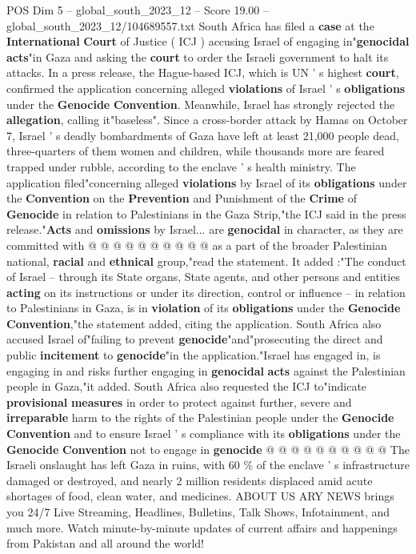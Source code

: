 \begin{textsample}{POS Dim 5 – global\_south\_2023\_12 – Score 19.00 – global\_south\_2023\_12/104689557.txt}  \label{ex:f5_pos_104}
South Africa has filed a \textbf{case} at the \textbf{International} \textbf{Court} of Justice ( ICJ ) accusing Israel of engaging in"\textbf{genocidal} \textbf{acts}"in Gaza and asking the \textbf{court} to order the Israeli government to halt its attacks.
In a press release, the Hague-based ICJ, which is UN ' s highest \textbf{court}, confirmed the application concerning alleged \textbf{violations} of Israel ' s \textbf{obligations} under the \textbf{Genocide} \textbf{Convention}.
Meanwhile, Israel has strongly rejected the \textbf{allegation}, calling it"baseless".
Since a cross-border attack by Hamas on October 7, Israel ' s deadly bombardments of Gaza have left at least 21,000 people dead, three-quarters of them women and children, while thousands more are feared trapped under rubble, according to the enclave ' s health ministry.
The application filed"concerning alleged \textbf{violations} by Israel of its \textbf{obligations} under the \textbf{Convention} on the \textbf{Prevention} and Punishment of the \textbf{Crime} of \textbf{Genocide} in relation to Palestinians in the Gaza Strip,"the ICJ said in the press release."\textbf{Acts} and \textbf{omissions} by Israel... are \textbf{genocidal} in character, as they are committed with @ @ @ @ @ @ @ @ @ @ as a part of the broader Palestinian national, \textbf{racial} and \textbf{ethnical} group,"read the statement.
It added :"The conduct of Israel -- through its State organs, State agents, and other persons and entities \textbf{acting} on its instructions or under its direction, control or influence -- in relation to Palestinians in Gaza, is in \textbf{violation} of its \textbf{obligations} under the \textbf{Genocide} \textbf{Convention},"the statement added, citing the application.
South Africa also accused Israel of"failing to prevent \textbf{genocide}"and"prosecuting the direct and public \textbf{incitement} to \textbf{genocide}"in the application."Israel has engaged in, is engaging in and risks further engaging in \textbf{genocidal} \textbf{acts} against the Palestinian people in Gaza,"it added.
South Africa also requested the ICJ to"indicate \textbf{provisional} \textbf{measures} in order to protect against further, severe and \textbf{irreparable} harm to the rights of the Palestinian people under the \textbf{Genocide} \textbf{Convention} and to ensure Israel ' s compliance with its \textbf{obligations} under the \textbf{Genocide} \textbf{Convention} not to engage in \textbf{genocide} @ @ @ @ @ @ @ @ @ @ The Israeli onslaught has left Gaza in ruins, with 60 \% of the enclave ' s infrastructure damaged or destroyed, and nearly 2 million residents displaced amid acute shortages of food, clean water, and medicines.
ABOUT US ARY NEWS brings you 24/7 Live Streaming, Headlines, Bulletins, Talk Shows, Infotainment, and much more.
Watch minute-by-minute updates of current affairs and happenings from Pakistan and all around the world!

\end{textsample}
